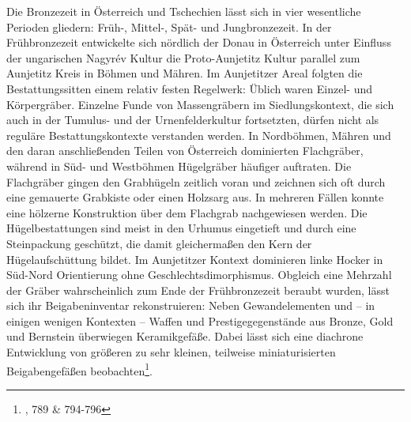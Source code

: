 \documentclass[openany,twoside,twocolumn]{book}
\let\rmarkdownfootnote\footnote%
\def\footnote{\protect\rmarkdownfootnote}
\begin{document}
Die Bronzezeit in Österreich und Tschechien lässt sich in vier
wesentliche Perioden gliedern: Früh-, Mittel-, Spät- und Jungbronzezeit.
In der Frühbronzezeit entwickelte sich nördlich der Donau in Österreich
unter Einfluss der ungarischen Nagyrév Kultur die Proto-Aunjetitz Kultur
parallel zum Aunjetitz Kreis in Böhmen und Mähren. Im Aunjetitzer Areal
folgten die Bestattungssitten einem relativ festen Regelwerk: Üblich
waren Einzel- und Körpergräber. Einzelne Funde von Massengräbern im
Siedlungskontext, die sich auch in der Tumulus- und der
Urnenfelderkultur fortsetzten, dürfen nicht als reguläre
Bestattungskontexte verstanden werden. In Nordböhmen, Mähren und den
daran anschließenden Teilen von Österreich dominierten Flachgräber,
während in Süd- und Westböhmen Hügelgräber häufiger auftraten. Die
Flachgräber gingen den Grabhügeln zeitlich voran und zeichnen sich oft
durch eine gemauerte Grabkiste oder einen Holzsarg aus. In mehreren
Fällen konnte eine hölzerne Konstruktion über dem Flachgrab nachgewiesen
werden. Die Hügelbestattungen sind meist in den Urhumus eingetieft und
durch eine Steinpackung geschützt, die damit gleichermaßen den Kern der
Hügelaufschüttung bildet. Im Aunjetitzer Kontext dominieren linke Hocker
in Süd-Nord Orientierung ohne Geschlechtsdimorphismus. Obgleich eine
Mehrzahl der Gräber wahrscheinlich zum Ende der Frühbronzezeit beraubt
wurden, lässt sich ihr Beigabeninventar rekonstruieren: Neben
Gewandelementen und -- in einigen wenigen Kontexten -- Waffen und
Prestigegegenstände aus Bronze, Gold und Bernstein überwiegen
Keramikgefäße. Dabei lässt sich eine diachrone Entwicklung von größeren
zu sehr kleinen, teilweise miniaturisierten Beigabengefäßen
beobachten\footnote{\textcite{lubos_czech_2013}, 789 \& 794-796}.
\end{document}
